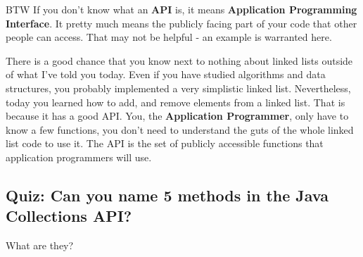 \documentclass[10pt]{article}
\begin{document}
BTW If you don't know what an \textbf{API} is, it means \textbf{Application Programming Interface}. It pretty much means the publicly facing part of your code that other people can access. That may not be helpful - an example is warranted here.

There is a good chance that you know next to nothing about linked lists outside of what I've told you today. Even if you have studied algorithms and data structures, you probably implemented a very simplistic linked list. Nevertheless, today you learned how to add, and remove elements from a linked list. That is because it has a good API. You, the \textbf{Application Programmer}, only have to know a few functions, you don't need to understand the guts of the whole linked list code to use it. The API is the set of publicly accessible functions that application programmers will use.

\subsection{Quiz: Can you name 5 methods in the Java Collections API?}
What are they?
\end{document}
